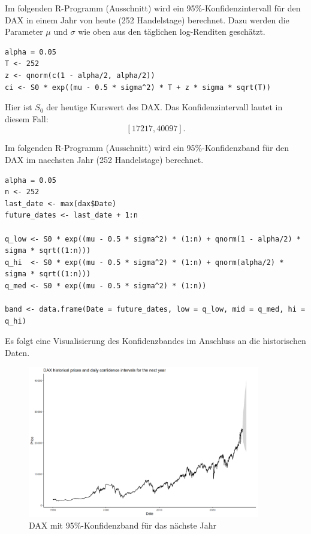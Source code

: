 \begin{bsp}

Im folgenden R-Programm (Ausschnitt) wird ein 95\%-Konfidenzintervall für den DAX in einem Jahr von heute (252 Handelstage) berechnet.
Dazu werden die Parameter $\mu$ und $\sigma$ wie oben aus den täglichen log-Renditen geschätzt.

\begin{lstlisting}
alpha = 0.05
T <- 252
z <- qnorm(c(1 - alpha/2, alpha/2))
ci <- S0 * exp((mu - 0.5 * sigma^2) * T + z * sigma * sqrt(T))
\end{lstlisting}

Hier ist $S_0$ der heutige Kurswert des DAX. Das Konfidenzintervall lautet in diesem Fall:
$$[17217, 40097].$$

\end{bsp}

\begin{bsp}

Im folgenden R-Programm (Ausschnitt) wird ein 95\%-Konfidenzband für den DAX im naechsten Jahr (252 Handelstage) berechnet.

\begin{lstlisting}
alpha = 0.05
n <- 252
last_date <- max(dax$Date)
future_dates <- last_date + 1:n

q_low <- S0 * exp((mu - 0.5 * sigma^2) * (1:n) + qnorm(1 - alpha/2) * sigma * sqrt((1:n)))
q_hi  <- S0 * exp((mu - 0.5 * sigma^2) * (1:n) + qnorm(alpha/2) * sigma * sqrt((1:n)))
q_med <- S0 * exp((mu - 0.5 * sigma^2) * (1:n))

band <- data.frame(Date = future_dates, low = q_low, mid = q_med, hi = q_hi)
\end{lstlisting}

Es folgt eine Visualisierung des Konfidenzbandes im Anschluss an die historischen Daten.

\begin{figure}[H]
    \centering
    \includegraphics[width=0.9\textwidth]{images/dax_confidence_band.png}
    \caption{DAX mit 95\%-Konfidenzband für das nächste Jahr}
    \label{fig:dax_confidence_band}
\end{figure}

\end{bsp}

